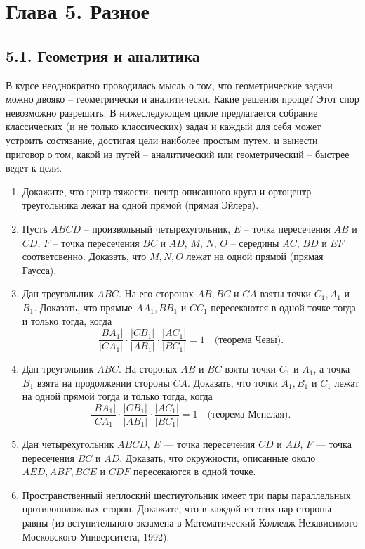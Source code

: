 % 
% 
	\section{Глава 5. Разное}
	\subsection{5.1. Геометрия и аналитика}
	В курсе неоднократно проводилась мысль о том, что геометрические задачи можно двояко -- геометрически и аналитически. Какие решения проще? Этот спор невозможно разрешить. В нижеследующем цикле предлагается собрание классических (и не только классических) задач и каждый для себя может устроить состязание, достигая цели наиболее простым путем, и вынести приговор о том, какой из путей -- аналитический или геометрический -- быстрее ведет к цели.
	\begin{enumerate}
		\item Докажите, что центр тяжести, центр описанного круга и ортоцентр треугольника лежат на одной прямой (прямая Эйлера).
		\item Пусть $ABCD$ -- произвольный четырехугольник, $E$ -- точка пересечения $AB$ и $CD$, $F$ -- точка пересечения $BC$ и $AD$, $M$, $N$, $O$ -- середины $AC$, $BD$ и $EF$ соответсвенно. Доказать, что $M, N, O$ лежат на одной прямой (прямая Гаусса).
		\item Дан треугольник $ABC$. На его сторонах $AB, BC$ и $CA$ взяты точки $C_1, A_1$ и $B_1$. Доказать, что прямые $AA_1, BB_1$ и $CC_1$ пересекаются в одной точке тогда и только тогда, когда 
		\[
			\frac{|BA_1|}{|CA_1|} \cdot \frac{|CB_1|}{|AB_1|} \cdot \frac{|AC_1|}{|BC_1|} = 1 \quad \text{(теорема Чевы)}.
		\]

		\item Дан треугольник $ABC$. На сторонах $AB$ и $BC$ взяты точки $C_1$ и $A_1$, а точка $B_1$ взята на продолжении стороны $CA$. Доказать, что точки $A_1, B_1$ и $C_1$ лежат на одной прямой тогда и только тогда, когда 
		\[ 
			\frac{|BA_1|}{|CA_1|} \cdot \frac{|CB_1|}{|AB_1|} \cdot \frac{|AC_1|}{|BC_1|} = 1 \quad \text{(теорема Менелая)}.
		\]

		\item Дан четырехугольник $ABCD$, $E$ — точка пересечения $CD$ и $AB$, $F$ — точка пересечения $BC$ и $AD$. Доказать, что окружности, описанные около $AED, ABF, BCE$ и $CDF$ пересекаются в одной точке.

		\item Пространственный неплоский шестиугольник имеет три пары параллельных противоположных сторон. Докажите, что в каждой из этих пар стороны равны (из вступительного экзамена в Математический Колледж Независимого Московского Университета, 1992).


\end{enumerate}
